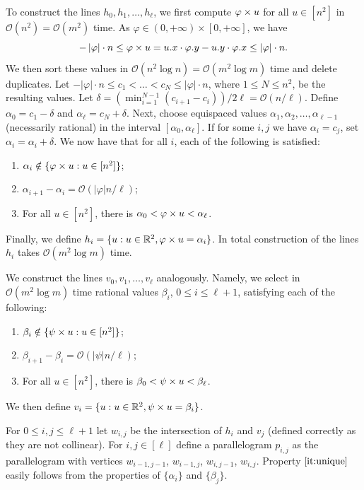 \documentclass[twoside,leqno]{article}
\newcommand{\R}{\mathbb{R}}
\renewcommand{\O}{\mathcal{O}}
\renewcommand{\phi}{\varphi}
\newcommand{\absolute}[1]{\left\lvert#1\right\rvert}
\begin{document}
To construct the lines $h_0, h_1, \ldots, h_\ell$, we first compute $\h{u}$ for all $u \in [n^2]$ in $\O(n^2) = \O(m^2)$ time. As $\phi \in (0,+\infty) \times [0,+\infty]$, we have 
$$-\absolute{\phi} \cdot n \le \h{u} = \x{u} \cdot \y{\phi} - \y{u} \cdot \x{\phi} \le \absolute{\phi} \cdot n.$$
We then sort these values in $\O(n^2 \log n) = \O(m^2 \log m)$ time and delete duplicates. Let $-\absolute{\phi} \cdot n \le c_1 < \ldots < c_{N} \le \absolute{\phi} \cdot n$, where $1 \le N \le n^2$, be the resulting values. Let $\delta = (\min_{i=1}^{N-1} (c_{i+1}-c_i))/2\ell = \O(n/\ell)$. Define $\alpha_0 = c_1 -\delta$ and $\alpha_\ell = c_{N} + \delta$. Next, choose equispaced values $\alpha_1, \alpha_2, \ldots, \alpha_{\ell-1}$ (necessarily rational) in the interval $[\alpha_0, \alpha_{\ell}]$. If for some $i, j$ we have $\alpha_i = c_j$, set $\alpha_i = \alpha_i + \delta$. We now have that for all $i$, each of the following is satisfied:
\begin{enumerate}
\item $\alpha_i \notin \{\h{u} : u \in [n^2]\}$;
\item $\alpha_{i+1}-\alpha_i = \O(\absolute{\phi} n / \ell)$;
\item For all $u \in [n^2]$, there is $\alpha_0 < \h{u} < \alpha_\ell$.
\end{enumerate}
Finally, we define $h_i = \{u: u \in \R^2, \h{u} = \alpha_i\}$. In total construction of the lines $h_i$ takes $\O(m^2 \log m)$ time.

We construct the lines $v_0, v_1, \ldots, v_\ell$ analogously. Namely, we select in $\O(m^2 \log m)$ time rational values $\beta_i$, $0 \le i \le \ell+1$, satisfying each of the following:
\begin{enumerate}
\item $\beta_i \notin \{\psi \times u : u \in [n^2]\}$;
\item $\beta_{i+1}-\beta_i = \O(\absolute{\psi} n / \ell)$;
\item For all $u \in [n^2]$, there is $\beta_0 < \psi \times u < \beta_\ell$.
\end{enumerate}
We then define $v_i = \{u: u \in \R^2, \s{u} = \beta_i\}$. 

For $0 \le i,j \le \ell+1$ let $w_{i,j}$ be the intersection of $h_i$ and $v_j$ (defined correctly as they are not collinear). For $i,j \in [\ell]$ define a parallelogram $p_{i,j}$ as the parallelogram with vertices $w_{i-1,j-1}$, $w_{i-1,j}$, $w_{i,j-1}$, $w_{i,j}$. Property $\ref{it:unique}$ easily follows from the properties of $\{\alpha_i\}$ and $\{\beta_j\}$.
\end{document}
